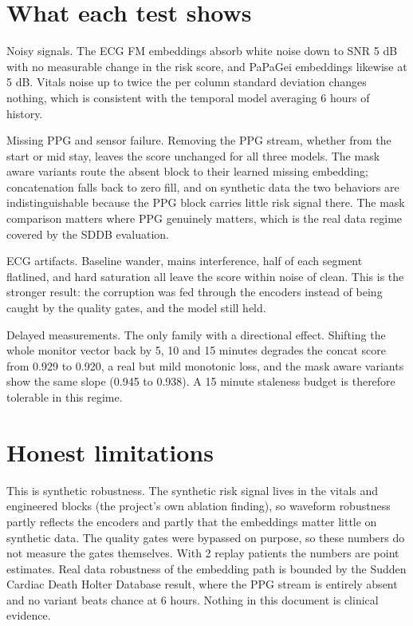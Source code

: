 \documentclass[11pt]{article}
\begin{document}
\section{What each test shows}

Noisy signals. The ECG FM embeddings absorb white noise down to SNR 5 dB
with no measurable change in the risk score, and PaPaGei embeddings likewise
at 5 dB. Vitals noise up to twice the per column standard deviation changes
nothing, which is consistent with the temporal model averaging 6 hours of
history.

Missing PPG and sensor failure. Removing the PPG stream, whether from the
start or mid stay, leaves the score unchanged for all three models. The mask
aware variants route the absent block to their learned missing embedding;
concatenation falls back to zero fill, and on synthetic data the two
behaviors are indistinguishable because the PPG block carries little risk
signal there. The mask comparison matters where PPG genuinely matters, which
is the real data regime covered by the SDDB evaluation.

ECG artifacts. Baseline wander, mains interference, half of each segment
flatlined, and hard saturation all leave the score within noise of clean.
This is the stronger result: the corruption was fed through the encoders
instead of being caught by the quality gates, and the model still held.

Delayed measurements. The only family with a directional effect. Shifting
the whole monitor vector back by 5, 10 and 15 minutes degrades the concat
score from 0.929 to 0.920, a real but mild monotonic loss, and the mask aware
variants show the same slope (0.945 to 0.938). A 15 minute staleness budget
is therefore tolerable in this regime.

\section{Honest limitations}
This is synthetic robustness. The synthetic risk signal lives in the vitals
and engineered blocks (the project's own ablation finding), so waveform
robustness partly reflects the encoders and partly that the embeddings
matter little on synthetic data. The quality gates were bypassed on purpose,
so these numbers do not measure the gates themselves. With 2 replay patients
the numbers are point estimates. Real data robustness of the embedding path
is bounded by the Sudden Cardiac Death Holter Database result, where the PPG
stream is entirely absent and no variant beats chance at 6 hours. Nothing in
this document is clinical evidence.
\end{document}
